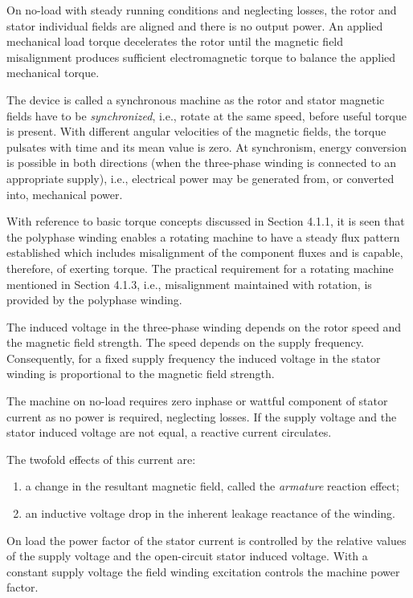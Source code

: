 \documentclass[a4paper,numbers=noenddot,12pt]{scrbook}
\begin{document}
On no-load with steady running conditions and neglecting losses, the rotor and stator individual fields are aligned and there is no output power. An applied mechanical load torque decelerates the rotor until the magnetic field misalignment produces sufficient electromagnetic torque to balance the applied mechanical torque.

The device is called a synchronous machine as the rotor and stator magnetic fields have to be \textit{synchronized}, i.e., rotate at the same speed, before useful torque is present. With different angular velocities of the magnetic fields, the torque pulsates with time and its mean value is zero. At synchronism, energy conversion is possible in both directions (when the three-phase winding is connected to an appropriate supply), i.e., electrical power may be generated
from, or converted into, mechanical power.

With reference to basic torque concepts discussed in Section 4.1.1, it is seen that the polyphase winding enables a rotating machine to have a steady flux pattern established which includes misalignment of the component fluxes and is capable, therefore, of exerting torque. The practical requirement for a rotating machine mentioned in Section 4.1.3, i.e., misalignment maintained with rotation, is provided by the polyphase winding.

The induced voltage in the three-phase winding depends on the rotor speed and the magnetic field strength. The speed depends on the supply frequency. Consequently, for a fixed supply frequency the induced voltage in the stator winding is proportional to the magnetic field strength.

The machine on no-load requires zero inphase or wattful component of stator current as no power is required, neglecting losses. If the supply voltage and the stator induced voltage are not equal, a reactive current circulates.

The twofold effects of this current are:
\begin{enumerate}
    \item a change in the resultant magnetic field, called the \textit{armature} reaction effect;
    \item an inductive voltage drop in the inherent leakage reactance of the winding. 
\end{enumerate}

On load the power factor of the stator current is controlled by the relative values of the supply voltage and the open-circuit stator induced voltage. With a constant supply voltage the field winding excitation controls the machine power factor.
\end{document}
